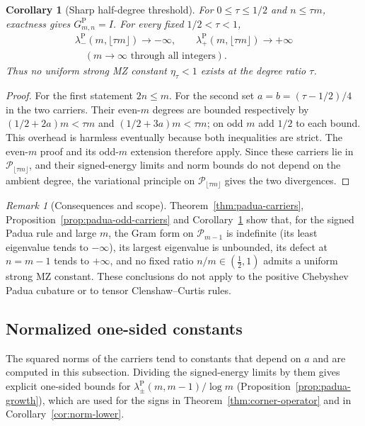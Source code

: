 \documentclass[preprint,12pt,a4paper]{elsarticle}
\newtheorem{corollary}[theorem]{Corollary}
\theoremstyle{remark}
\newtheorem{remark}[theorem]{Remark}
\newcommand{\Pa}{\mathrm P}
\begin{document}
\begin{corollary}[Sharp half-degree threshold]\label{cor:padua-ratio}
For $0\le\tau\le1/2$ and $n\le\tau m$, exactness gives
$G^\Pa_{m,n}=I$. For every fixed $1/2<\tau<1$,
\[
 \begin{gathered}
 \lambda^\Pa_-(m,\lfloor\tau m\rfloor)\to-\infty,\qquad
 \lambda^\Pa_+(m,\lfloor\tau m\rfloor)\to+\infty\\
 \quad(m\to\infty\text{ through all integers}).
 \end{gathered}
\]
Thus no uniform strong MZ constant $\eta_\tau<1$ exists at the
degree ratio $\tau$.
\end{corollary}
\begin{proof}
For the first statement $2n\le m$. For the second set
$a=b=(\tau-1/2)/4$ in the two carriers. Their even-$m$ degrees are
bounded respectively by $(1/2+2a)m<\tau m$ and
$(1/2+3a)m<\tau m$; on odd $m$ add $1/2$ to each bound.
This overhead is harmless eventually because both inequalities are strict.
The even-$m$ proof and its odd-$m$ extension therefore apply.
Since these carriers lie in $\mathcal P_{\lfloor\tau m\rfloor}$, and their
signed-energy limits and norm bounds do not depend on the ambient degree, the
variational principle on $\mathcal P_{\lfloor\tau m\rfloor}$ gives the two
divergences.
\end{proof}

\begin{remark}[Consequences and scope]\label{rem:refuted}
Theorem~\ref{thm:padua-carriers}, Proposition~\ref{prop:padua-odd-carriers}
and Corollary~\ref{cor:padua-ratio} show that, for the signed Padua rule and
large $m$, the Gram form on $\mathcal P_{m-1}$ is indefinite (its least eigenvalue
tends to $-\infty$), its largest eigenvalue is unbounded, its defect at
$n=m-1$ tends to $+\infty$, and no fixed ratio $n/m\in(\tfrac12,1)$ admits a
uniform strong MZ constant. These conclusions do not apply to the positive
Chebyshev Padua cubature or to tensor Clenshaw--Curtis rules.
\end{remark}

\subsection{Normalized one-sided constants}
The squared norms of the carriers tend to constants that depend on $a$ and are
computed in this subsection. Dividing the signed-energy limits by them gives
explicit one-sided bounds for $\lambda^\Pa_\pm(m,m-1)/\log m$
(Proposition~\ref{prop:padua-growth}), which are used for the signs in
Theorem~\ref{thm:corner-operator} and in Corollary~\ref{cor:norm-lower}.
\end{document}
